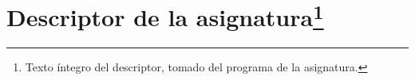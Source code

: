 \section[Descriptor de la asignatura]{Descriptor de la asignatura\footnote{Texto íntegro del descriptor, tomado del programa de la asignatura.}}


\lipsum[1-4] %
\pagebreak